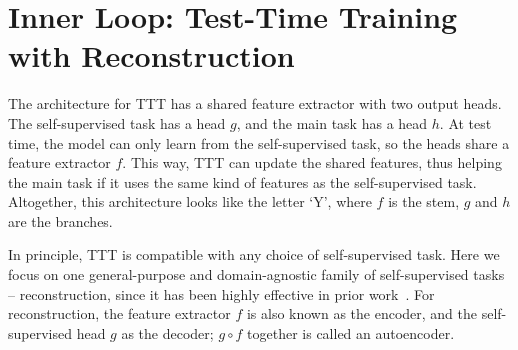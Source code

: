 \documentclass{article}
\begin{document}
\section{Inner Loop: Test-Time Training with Reconstruction}
\label{sec:background}
The architecture for TTT has a shared feature extractor with two output heads.
The self-supervised task has a head $g$, and the main task has a head $h$.
At test time, the model can only learn from the self-supervised task, so the heads share a feature extractor $f$. This way, TTT can update the shared features, thus helping the main task if it uses the same kind of features as the self-supervised task.
Altogether, this architecture looks like the letter `Y', where $f$ is the stem, $g$ and $h$ are the branches. 

In principle, TTT is compatible with any choice of self-supervised task.
Here we focus on one general-purpose and domain-agnostic family of self-supervised tasks -- reconstruction, since it has been highly effective in prior work~\citep{denoisingautoencoder, pathak2016context, brown2020language, beit, mae}. 
For reconstruction, the feature extractor $f$ is also known as the encoder, and the self-supervised head $g$ as the decoder; $g\circ f$ together is called an autoencoder.
\end{document}
